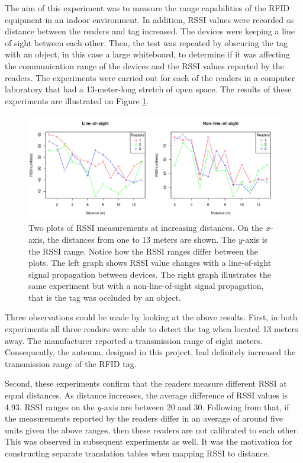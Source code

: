 The aim of this experiment was to measure the range capabilities of the RFID equipment in an indoor environment. In addition, RSSI values were recorded as distance between the readers and tag increased. The devices were keeping a line of sight between each other. Then, the test was repeated by obscuring the tag with an object, in this case a large whiteboard, to determine if it was affecting the communication range of the devices and the RSSI values reported by the readers. The experiments were carried out for each of the readers in a computer laboratory that had a 13-meter-long stretch of open space. The results of these experiments are illustrated on Figure \ref{fig:13m}.

\begin{figure}[h]
	\begin{center}
		\includegraphics[width=1\textwidth]{figures/rssi_distance_13m}
		\caption{Two plots of RSSI measurements at increasing distances. On the $x$-axis, the distances from one to 13 meters are shown. The $y$-axis is the RSSI range. Notice how the RSSI ranges differ between the plots. The left graph shows RSSI value changes with a line-of-sight signal propagation between devices. The right graph illustrates the same experiment but with a non-line-of-sight signal propagation, that is the tag was occluded by an object.}
		\label{fig:13m}
	\end{center}
\end{figure}

Three observations could be made by looking at the above results. First, in both experiments all three readers were able to detect the tag when located 13 meters away. The manufacturer reported a transmission range of eight meters. Consequently, the antenna, designed in this project, had definitely increased the transmission range of the RFID tag. 

Second, these experiments confirm that the readers measure different RSSI at equal distances. As distance increases, the average difference of RSSI values is 4.93. RSSI ranges on the $y$-axis are between 20 and 30. Following from that, if the measurements reported by the readers differ in an average of around five units given the above ranges, then these readers are not calibrated to each other. This was observed in subsequent experiments as well. It was the motivation for constructing separate translation tables when mapping RSSI to distance.

